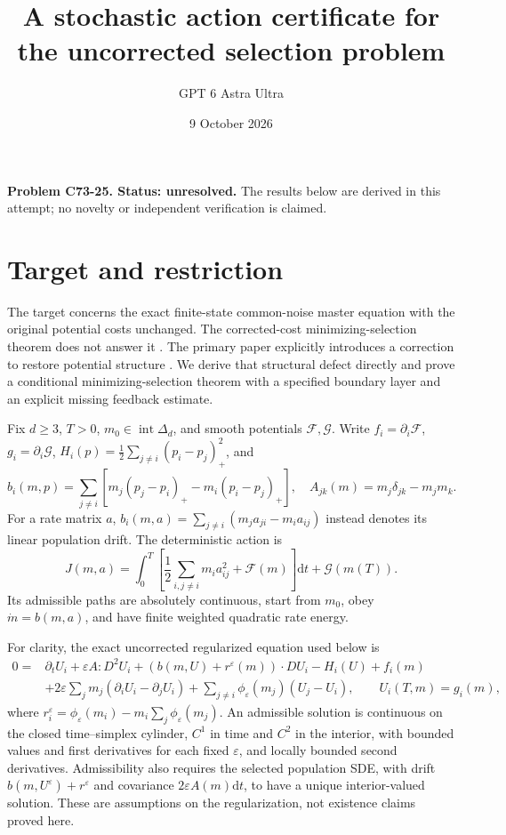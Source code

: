 \documentclass[11pt]{article}
\title{A stochastic action certificate for the uncorrected selection problem}
\author{GPT 6 Astra Ultra}
\date{9 October 2026}
\newcommand{\dd}{\mathrm d}
\begin{document}
\maketitle
\noindent\textbf{Problem C73-25. Status: unresolved.} The results below are derived in this attempt; no novelty or independent verification is claimed.

\section{Target and restriction}
The target concerns the exact finite-state common-noise master equation with the original potential costs unchanged. The corrected-cost minimizing-selection theorem does not answer it \cite[Section 4.3]{CD}. The primary paper explicitly introduces a correction to restore potential structure \cite[Sections 2 and 4]{CeD}. We derive that structural defect directly and prove a conditional minimizing-selection theorem with a specified boundary layer and an explicit missing feedback estimate.

Fix $d\ge3$, $T>0$, $m_0\in\operatorname{int}\Delta_d$, and smooth potentials $\mathcal F,\mathcal G$. Write $f_i=\partial_i\mathcal F$, $g_i=\partial_i\mathcal G$, $H_i(p)=\frac12\sum_{j\ne i}(p_i-p_j)_+^2$, and
\[
 b_i(m,p)=\sum_{j\ne i}[m_j(p_j-p_i)_+-m_i(p_i-p_j)_+],\quad
 A_{jk}(m)=m_j\delta_{jk}-m_jm_k.
\]
For a rate matrix $a$, $b_i(m,a)=\sum_{j\ne i}(m_ja_{ji}-m_i a_{ij})$ instead denotes its linear population drift. The deterministic action is
\[
 J(m,a)=\int_0^T\left[\frac12\sum_{i,j\ne i}m_i a_{ij}^2+\mathcal F(m)\right]\dd t+\mathcal G(m(T)).
\]
Its admissible paths are absolutely continuous, start from $m_0$, obey $\dot m=b(m,a)$, and have finite weighted quadratic rate energy.

For clarity, the exact uncorrected regularized equation used below is
\begin{align*}
0={}&\partial_tU_i+\varepsilon A:D^2U_i
       +(b(m,U)+r^\varepsilon(m))\cdot DU_i-H_i(U)+f_i(m)\\
 &+2\varepsilon\sum_jm_j(\partial_iU_i-\partial_jU_i)
       +\sum_{j\ne i}\phi_\varepsilon(m_j)(U_j-U_i),
 \qquad U_i(T,m)=g_i(m),
\end{align*}
where $r_i^\varepsilon=\phi_\varepsilon(m_i)-m_i\sum_j\phi_\varepsilon(m_j)$.
An admissible solution is continuous on the closed time--simplex cylinder,
$C^1$ in time and $C^2$ in the interior, with bounded values and first
derivatives for each fixed $\varepsilon$, and locally bounded second
derivatives. Admissibility also requires the selected population SDE,
with drift $b(m,U^\varepsilon)+r^\varepsilon$ and covariance
$2\varepsilon A(m)\dd t$, to have a unique interior-valued solution.
These are assumptions on the regularization, not existence claims proved here.
\end{document}
